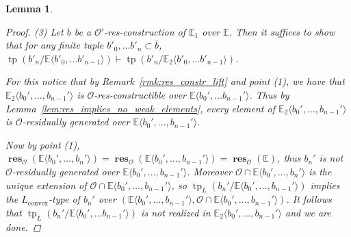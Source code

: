 \documentclass{amsart}
\newtheorem{lemma}[theorem]{Lemma}
\theoremstyle{remark}
\theoremstyle{definition}
\theoremstyle{plain}
\newcommand{\bE}{\mathbb E}
\newcommand{\cO}{\mathcal O}
\newcommand{\ob}{\overline{b}}
\newcommand{\convex}{\mathrm{convex}}
\DeclareMathOperator{\res}{\mathbf{res}}
\DeclareMathOperator{\tp}{\mathrm{tp}}
\theoremstyle{plain}
\begin{document}
\begin{lemma}
\begin{proof}
        (3) Let $\ob$ be a $\cO'$-res-construction of $\bE_1$ over $\bE$.
        Then it suffices to show that for any finite tuple $b'_0, \ldots b'_n \subset \ob$, $\tp(b'_n/\bE\langle b'_0, \ldots b'_{n-1}\rangle) \vdash \tp(b'_n/\bE_2\langle b'_0, \ldots b'_{n-1}\rangle)$.
        
        For this notice that by Remark~\ref{rmk:res_constr_lift} and point (1), we have that $\bE_2\langle b_0', \ldots, b_{n-1}'\rangle$ is $\cO$-res-constructible over $\bE\langle b_0', \ldots b_{n-1}'\rangle$. Thus by Lemma~\ref{lem:res_implies_no_weak_elements}, every element of $\bE_2\langle b_0', \ldots, b_{n-1}'\rangle$ is $\cO$-residually generated over $\bE \langle b_0', \ldots, b_{n-1}'\rangle$.

        Now by point (1), $\res_\cO(\bE \langle b_0', \ldots, b_n'\rangle)=\res_\cO(\bE \langle b_0', \ldots, b_{n-1}'\rangle)=\res_\cO(\bE)$, thus $b_n'$ is not $\cO$-residually generated over $\bE \langle b_0', \ldots, b_{n-1}'\rangle$.
        Moreover $\cO \cap \bE \langle b_0', \ldots, b_{n}'\rangle$ is the unique extension of $\cO \cap \bE \langle b_0', \ldots, b_{n-1}'\rangle$, so $\tp_L(b_n'/\bE \langle b_0', \ldots, b_{n-1}'\rangle)$ implies the $L_\convex$-type of $b_n'$ over $(\bE \langle b_0', \ldots, b_{n-1}'\rangle, \cO \cap \bE \langle b_0', \ldots, b_{n-1}'\rangle)$.
        It follows that $\tp_{L}(b_n'/\bE\langle b_0', \ldots b_{n-1}'\rangle)$ is not realized in $\bE_2 \langle b_0', \ldots, b_{n-1}'\rangle$ and we are done.
    \end{proof}
\end{lemma}
\end{document}
